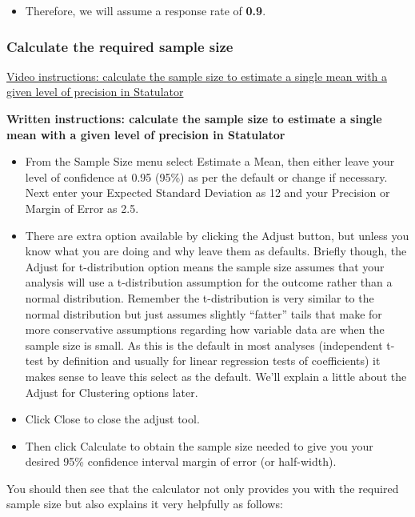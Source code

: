 \documentclass[
]{book}
\providecommand{\tightlist}{%
  \setlength{\itemsep}{0pt}\setlength{\parskip}{0pt}}
\begin{document}
\begin{itemize}
\tightlist
\item
  Therefore, we will assume a response rate of \textbf{0.9}.
\end{itemize}

\hypertarget{calculate-the-required-sample-size}{%
\subsubsection{Calculate the required sample size}\label{calculate-the-required-sample-size}}

\href{https://youtu.be/yzFY3LqvEKg}{Video instructions: calculate the sample size to estimate a single mean with a given level of precision in Statulator}

\textbf{Written instructions: calculate the sample size to estimate a single mean with a given level of precision in Statulator}

\begin{itemize}
\item
  From the Sample Size menu select Estimate a Mean, then either leave your level of confidence at 0.95 (95\%) as per the default or change if necessary. Next enter your Expected Standard Deviation as 12 and your Precision or Margin of Error as 2.5.
\item
  There are extra option available by clicking the Adjust button, but unless you know what you are doing and why leave them as defaults. Briefly though, the Adjust for t-distribution option means the sample size assumes that your analysis will use a t-distribution assumption for the outcome rather than a normal distribution. Remember the t-distribution is very similar to the normal distribution but just assumes slightly ``fatter'' tails that make for more conservative assumptions regarding how variable data are when the sample size is small. As this is the default in most analyses (independent t-test by definition and usually for linear regression tests of coefficients) it makes sense to leave this select as the default. We'll explain a little about the Adjust for Clustering options later.
\item
  Click Close to close the adjust tool.
\item
  Then click Calculate to obtain the sample size needed to give you your desired 95\% confidence interval margin of error (or half-width).
\end{itemize}

You should then see that the calculator not only provides you with the required sample size but also explains it very helpfully as follows:
\end{document}
